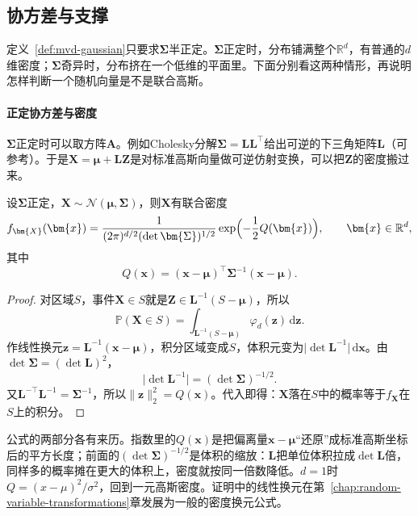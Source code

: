 \subsection{协方差与支撑}
\label{sec:mvd-gaussian-support}

定义~\ref{def:mvd-gaussian}只要求$\bm{\Sigma}$半正定。$\bm{\Sigma}$正定时，分布铺满整个$\mathbb{R}^{d}$，有普通的$d$维密度；$\bm{\Sigma}$奇异时，分布挤在一个低维的平面里。下面分别看这两种情形，再说明怎样判断一个随机向量是不是联合高斯。

\paragraph{正定协方差与密度}
$\bm{\Sigma}$正定时可以取方阵$\bm{A}$。例如Cholesky分解$\bm{\Sigma}=\bm{L}\bm{L}^{\top}$给出可逆的下三角矩阵$\bm{L}$（可参考）。于是$\bm{X}=\bm{\mu}+\bm{L}\bm{Z}$是对标准高斯向量做可逆仿射变换，可以把$\bm{Z}$的密度搬过来。

\begin{theorem}[多元高斯密度]
\label{thm:mvd-gaussian-density}
设$\bm{\Sigma}$正定，$\bm{X}\sim\mathcal{N}(\bm{\mu},\bm{\Sigma})$，则$\bm{X}$有联合密度
\begin{equation}
 f_{\bm{X}}(\bm{x})=\frac{1}{(2\pi)^{d/2}(\det\bm{\Sigma})^{1/2}}\exp\Bigl(-\frac12Q(\bm{x})\Bigr),\qquad \bm{x}\in\mathbb{R}^{d},
 \label{eq:mvd-gaussian-density}
\end{equation}
其中
\begin{equation}
 Q(\bm{x})=(\bm{x}-\bm{\mu})^{\top}\bm{\Sigma}^{-1}(\bm{x}-\bm{\mu}) .
 \label{eq:mvd-gaussian-quadratic}
\end{equation}
\end{theorem}

\begin{proof}
对区域$S$，事件$\bm{X}\in S$就是$\bm{Z}\in\bm{L}^{-1}(S-\bm{\mu})$，所以
\[
 \mathbb{P}(\bm{X}\in S)=\int_{\bm{L}^{-1}(S-\bm{\mu})}\varphi_d(\bm{z})\,\mathrm{d}\bm{z} .
\]
作线性换元$\bm{z}=\bm{L}^{-1}(\bm{x}-\bm{\mu})$，积分区域变成$S$，体积元变为$\lvert\det\bm{L}^{-1}\rvert\,\mathrm{d}\bm{x}$。由$\det\bm{\Sigma}=(\det\bm{L})^{2}$，
\[
 \lvert\det\bm{L}^{-1}\rvert=(\det\bm{\Sigma})^{-1/2} .
\]
又$\bm{L}^{-\top}\bm{L}^{-1}=\bm{\Sigma}^{-1}$，所以$\lVert\bm{z}\rVert_2^{2}=Q(\bm{x})$。代入即得：$\bm{X}$落在$S$中的概率等于$f_{\bm{X}}$在$S$上的积分。
\end{proof}

公式的两部分各有来历。指数里的$Q(\bm{x})$是把偏离量$\bm{x}-\bm{\mu}$“还原”成标准高斯坐标后的平方长度；前面的$(\det\bm{\Sigma})^{-1/2}$是体积的缩放：$\bm{L}$把单位体积拉成$\det\bm{L}$倍，同样多的概率摊在更大的体积上，密度就按同一倍数降低。$d=1$时$Q=(x-\mu)^{2}/\sigma^{2}$，回到一元高斯密度。证明中的线性换元在第~\ref{chap:random-variable-transformations}章发展为一般的密度换元公式。


